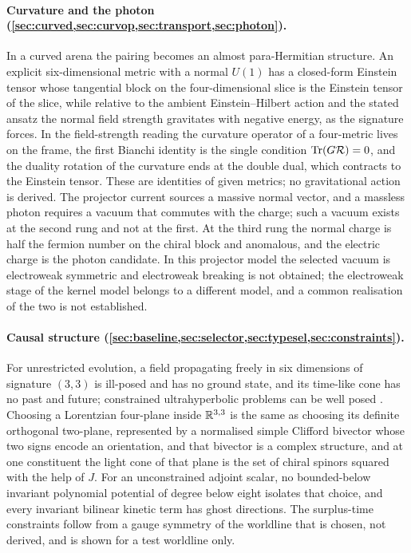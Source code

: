 \paragraph{Curvature and the photon (\cref{sec:curved,sec:curvop,sec:transport,sec:photon}).} In a curved arena the
pairing becomes an almost para-Hermitian structure. An explicit six-dimensional metric with a normal $U(1)$ has a
closed-form Einstein tensor whose tangential block on the four-dimensional slice is the Einstein tensor of the slice, while
relative to the ambient Einstein--Hilbert action and the stated ansatz the normal field strength gravitates with negative energy, as
the signature forces. In the field-strength reading the
curvature operator of a four-metric lives on the frame, the first Bianchi identity is the single condition
$\operatorname{Tr}(G\mathcal R)=0$, and the duality rotation of the curvature ends at the double dual, which contracts to the Einstein tensor.
These are identities of given metrics; no gravitational action is derived. The projector current sources a massive normal vector, and a massless photon requires a vacuum that commutes with the
charge; such a vacuum exists at the second rung and not at the first. At the third rung the normal charge is half the fermion
number on the chiral block and anomalous, and the electric charge is the photon candidate. In this projector model the selected vacuum is electroweak symmetric and electroweak
breaking is not obtained; the electroweak stage of the kernel model belongs to a different model, and a common realisation of the two is not
established.

\paragraph{Causal structure (\cref{sec:baseline,sec:selector,sec:typesel,sec:constraints}).} For unrestricted evolution, a field propagating
freely in six dimensions of signature $(3,3)$ is ill-posed and has no ground state, and its time-like cone has no past and future;
constrained ultrahyperbolic problems can be well posed \cite{CraigWeinstein09}.
Choosing a Lorentzian four-plane inside $\mathbb{R}^{3,3}$ is the same as choosing its definite orthogonal two-plane, represented by a normalised simple
Clifford bivector whose two signs encode an orientation, and that bivector is a complex structure, and at one constituent the
light cone of that plane is the set of chiral spinors squared with the help of $J$. For an unconstrained adjoint scalar, no bounded-below
invariant polynomial potential of degree below eight isolates that choice, and every invariant bilinear kinetic term has ghost directions. The
surplus-time constraints follow from a gauge symmetry of the worldline that is chosen, not derived, and is shown for a test worldline only.

